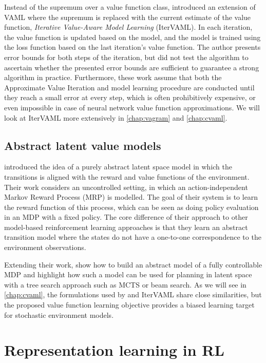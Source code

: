 Instead of the supremum over a value function class, \textcite{itervaml} introduced an extension of VAML where the supremum is replaced with the current estimate of the value function, \emph{Iterative Value-Aware Model Learning} (IterVAML).
In each iteration, the value function is updated based on the model, and the model is trained using the loss function based on the last iteration's value function.
The author presents error bounds for both steps of the iteration, but did not test the algorithm to ascertain whether the presented error bounds are sufficient to guarantee a strong algorithm in practice. 
Furthermore, these work assume that both the Approximate Value Iteration and model learning procedure are conducted until they reach a small error at every step, which is often prohibitively expensive, or even impossible in case of neural network value function approximations.
We will look at IterVAML more extensively in \autoref{chap:vagram} and \autoref{chap:cvaml}.


\subsection{Abstract latent value models}

\textcite{silver2017predictron} introduced the idea of a purely abstract latent space model in which the transitions is aligned with the reward and value functions of the environment.
Their work considers an uncontrolled setting, in which an action-independent Markov Reward Process (MRP) is modelled.
The goal of their system is to learn the reward function of this process, which can be seen as doing policy evaluation in an MDP with a fixed policy.
The core difference of their approach to other model-based reinforcement learning approaches is that they learn an abstract transition model where the states do not have a one-to-one correspondence to the environment observations.

Extending their work, \textcite{oh2017value} show how to build an abstract model of a fully controllable MDP and highlight how such a model can be used for planning in latent space with a tree search approach such as MCTS \parencite{schrittwieser2020mastering} or beam search.
As we will see in \autoref{chap:cvaml}, the formulations used by \textcite{silver2017predictron,schrittwieser2020mastering} and IterVAML share close similarities, but the proposed value function learning objective provides a biased learning target for stochastic environment models.

\section{Representation learning in RL}

